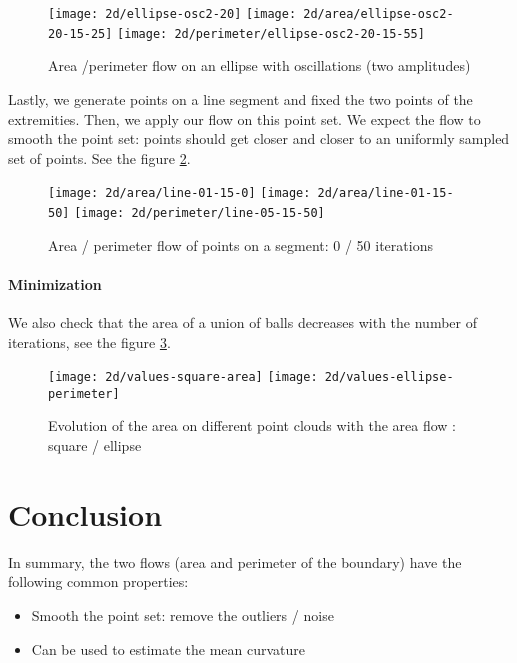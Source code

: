 \begin{figure}[h]
    \centering

    \texttt{[image: 2d/ellipse-osc2-20]}
    \texttt{[image: 2d/area/ellipse-osc2-20-15-25]}
    \texttt{[image: 2d/perimeter/ellipse-osc2-20-15-55]}
    \caption{Area /perimeter flow on an ellipse with oscillations (two
        amplitudes)}

    \label{fig:ellipse_osc2_flow}
\end{figure}


Lastly, we generate points on a line segment and fixed the two points of the
extremities. Then, we apply our flow on this point set. We expect the flow to
smooth the point set: points should get closer and closer to an uniformly
sampled set of points. See the figure \ref{fig:line_fixed_flow}.

\begin{figure}[h]
    \centering

    \texttt{[image: 2d/area/line-01-15-0]}
    \texttt{[image: 2d/area/line-01-15-50]}
    \texttt{[image: 2d/perimeter/line-05-15-50]}
    \caption{Area / perimeter flow of points on a segment: 0 / 50 iterations}

    \label{fig:line_fixed_flow}
\end{figure}

\paragraph{Minimization}

We also check that the area of a union of balls decreases with the number of
iterations, see the figure \ref{fig:area_time_decrease}.

\begin{figure}[h]
    \centering
    \texttt{[image: 2d/values-square-area]}
    \texttt{[image: 2d/values-ellipse-perimeter]}
    \caption{Evolution of the area on different point clouds with the area
        flow : square / ellipse}
    \label{fig:area_time_decrease}
\end{figure}

\section{Conclusion}

In summary, the two flows (area and perimeter of the boundary) have the
following common properties:
\begin{itemize}
    \item Smooth the point set: remove the outliers / noise
    \item Can be used to estimate the mean curvature
\end{itemize}

